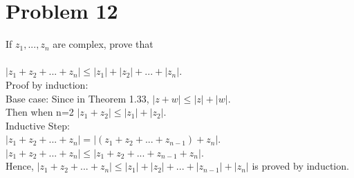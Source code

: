 \section*{Problem 12}
If $z_1,...,z_n$ are complex, prove that \\
\\$|z_1 +z_2 + ... +z_n| \leq |z_1| + |z_2| + ... +|z_n|.$ \\ 
Proof by induction: \\ 
Base case:
Since in Theorem 1.33, $|z+w| \leq |z|+|w|.$ \\ 
Then when n=2 $|z_1+z_2| \leq |z_1|+|z_2|$.
\\ 
Inductive Step:
\\ 
$|z_1+z_2 + ... +z_n|= |(z_1 +z_2 + ... + z_{n-1}) +z_n|.$ \\ 
$|z_1+z_2 + ... +z_n|\leq |z_1 +z_2 + ... + z_{n-1} +z_n|.$ \\ 
Hence, $|z_1+z_2 + ... +z_n| \leq |z_1| +|z_2| + ... + |z_{n-1}| +|z_n|$ is proved by induction. \\ 
\begin{figure}[ht]\end{figure} 

